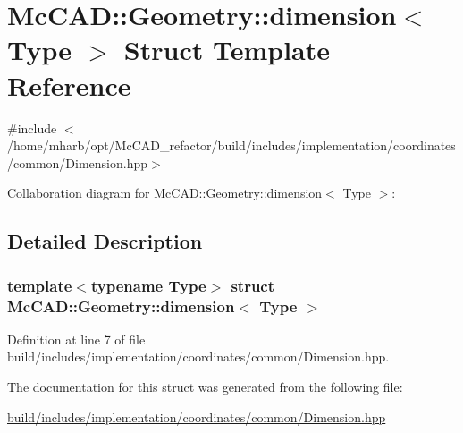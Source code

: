\hypertarget{structMcCAD_1_1Geometry_1_1dimension}{}\section{Mc\+C\+AD\+:\+:Geometry\+:\+:dimension$<$ Type $>$ Struct Template Reference}
\label{structMcCAD_1_1Geometry_1_1dimension}


{\ttfamily \#include $<$/home/mharb/opt/\+Mc\+C\+A\+D\+\_\+refactor/build/includes/implementation/coordinates/common/\+Dimension.\+hpp$>$}



Collaboration diagram for Mc\+C\+AD\+:\+:Geometry\+:\+:dimension$<$ Type $>$\+:


\subsection{Detailed Description}
\subsubsection*{template$<$typename Type$>$\newline
struct Mc\+C\+A\+D\+::\+Geometry\+::dimension$<$ Type $>$}



Definition at line 7 of file build/includes/implementation/coordinates/common/\+Dimension.\+hpp.



The documentation for this struct was generated from the following file\+:\begin{DoxyCompactItemize}
\item 
\hyperlink{build_2includes_2implementation_2coordinates_2common_2Dimension_8hpp}{build/includes/implementation/coordinates/common/\+Dimension.\+hpp}\end{DoxyCompactItemize}
